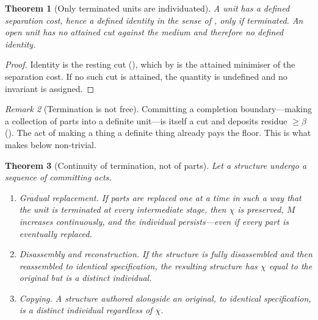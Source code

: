 \documentclass[11pt,twocolumn,a4paper]{article}
\theoremstyle{dirthm}
\newtheorem{theorem}{Theorem}[section]
\theoremstyle{definition}
\theoremstyle{remark}
\newtheorem{remark}[theorem]{Remark}
\newcommand{\flo}{\beta}
\newcommand{\rec}{M}
\newcommand{\Char}{\chi}
\begin{document}
\begin{theorem}[Only terminated units are individuated]
\label{thm:terminate}
A unit has a defined separation cost, hence a defined identity in the sense
of , only if terminated. An open unit has no attained cut
against the medium and therefore no defined identity.
\end{theorem}

\begin{proof}
Identity is the resting cut (), which by 
is the attained minimiser of the separation cost. If no such cut is attained,
the quantity is undefined and no invariant is assigned.
\end{proof}

\begin{remark}[Termination is not free]
\label{rem:termination-cost}
Committing a completion boundary---making a collection of parts into a
definite unit---is itself a cut and deposits residue $\ge\flo$
(). The act of making a thing a definite thing already
pays the floor. This is what makes  below
non-trivial.
\end{remark}

\begin{theorem}[Continuity of termination, not of parts]
\label{thm:termination-crit}
Let a structure undergo a sequence of committing acts.
\begin{enumerate}[label=\textup{(\roman*)},leftmargin=2.0em,itemsep=2pt]
\item \emph{Gradual replacement.} If parts are replaced one at a time in such
a way that the unit is terminated at every intermediate stage, then $\Char$ is
preserved, $\rec$ increases continuously, and the individual persists---even
if every part is eventually replaced.
\item \emph{Disassembly and reconstruction.} If the structure is fully
disassembled and then reassembled to identical specification, the resulting
structure has $\Char$ equal to the original but is a distinct individual.
\item \emph{Copying.} A structure authored alongside an original, to identical
specification, is a distinct individual regardless of $\Char$.
\end{enumerate}
\end{theorem}
\end{document}
